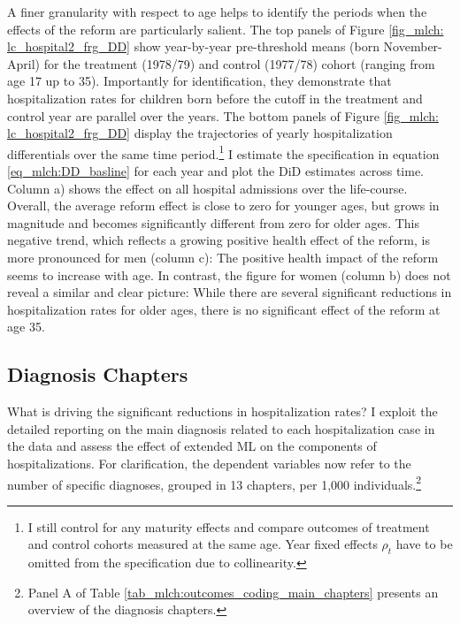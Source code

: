 A finer granularity with respect to age helps to identify the periods when the effects of the reform are particularly salient. The top panels of Figure \ref{fig_mlch: lc_hospital2_frg_DD} show year-by-year pre-threshold means (born November-April) for the treatment (1978/79) and control (1977/78) cohort (ranging from age 17 up to 35). Importantly for identification, they demonstrate that hospitalization rates for children born before the cutoff in the treatment and control year are parallel over the years. The bottom panels of Figure \ref{fig_mlch: lc_hospital2_frg_DD} display the trajectories of yearly hospitalization differentials over the same time period.\footnote{I still control for any maturity effects and compare outcomes of treatment and control cohorts measured at the same age. Year fixed effects $\rho_t$ have to be omitted from the specification due to collinearity.} I estimate the specification in equation \ref{eq_mlch:DD_basline} for each year and plot the DiD estimates across time. Column a) shows the effect on all hospital admissions over the life-course. Overall, the average reform effect is close to zero for younger ages, but grows in magnitude and becomes significantly different from zero for older ages. This negative trend, which reflects a growing positive health effect of the reform, is more pronounced for men (column c): The positive health impact of the reform seems to increase with age. In contrast, the figure for women (column b) does not reveal a similar and clear picture: While there are several significant reductions in hospitalization rates for older ages, there is no significant effect of the reform at age 35.



\bigskip
\subsection{Diagnosis Chapters}

What is driving the significant reductions in hospitalization rates? I exploit the detailed reporting on the main diagnosis related to each hospitalization case in the data and assess the effect of extended ML on the components of hospitalizations. For clarification, the dependent variables now refer to the number of specific diagnoses, grouped in 13 chapters, per 1,000 individuals.\footnote{Panel A of Table \ref{tab_mlch:outcomes_coding_main_chapters} presents an overview of the diagnosis chapters.} 


